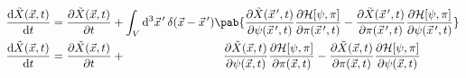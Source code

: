 \begin{align}
  \odv{\tilde{X}(\vec{x}, t)}{t} & = \pdv{\tilde{X}(\vec{x}, t)}{t}
  + \int_V \odif[3]{\vec{x}^{\,\prime}} \, \delta(\vec{x} - \vec{x}^{\,\prime}) \pab{\frac{\partial \tilde{X}(\vec{x}^{\,\prime}, t)}{\partial \psi(\vec{x}^{\,\prime}, t)} \frac{\partial \hami[\psi, \pi]}{\partial \pi(\vec{x}^{\,\prime}, t)} - \frac{\partial \tilde{X}(\vec{x}^{\,\prime}, t)}{\partial \pi(\vec{x}^{\,\prime}, t)} \frac{\partial \hami[\psi, \pi]}{\partial \psi(\vec{x}^{\,\prime}, t)}} \\
  \odv{\tilde{X}(\vec{x}, t)}{t} & = \pdv{\tilde{X}(\vec{x}, t)}{t}
  + \hphantom{\int_V \odif[3]{\vec{x}^{\,\prime}} \delta(\vec{x} - \vec{x}^{\,\prime})} \, \hspace{7.5pt} \frac{\partial \tilde{X}(\vec{x}, t)}{\partial \psi(\vec{x}, t)} \frac{\partial \hami[\psi, \pi]}{\partial \pi(\vec{x}, t)}
  - \frac{\partial \tilde{X}(\vec{x}, t)}{\partial \pi(\vec{x}, t)} \frac{\partial \hami[\psi, \pi]}{\partial \psi(\vec{x}, t)}
\end{align}